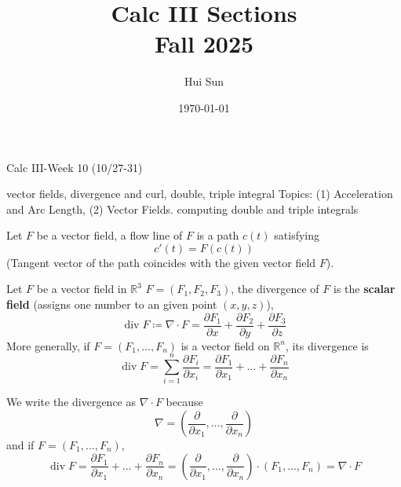 \documentclass[openany]{book}
\title{Calc III Sections
\\ 
\vspace{0.4cm}
\large Fall 2025}
\date{\today}
\author{Hui Sun}
\newcommand{\R}{\mathbb{R}}
\newcommand{\diverg}{\operatorname{div}}
\begin{document}
\maketitle

\newpage


\begin{center}
    \Large Calc III-Week 10 (10/27-31)
\end{center}

\renewcommand\thesection{\arabic{section}}

\noindent


vector fields, divergence and curl, double, triple integral
Topics: (1) Acceleration and Arc Length, (2) Vector Fields.
computing double and triple integrals



\begin{defn}
    Let ${F}$ be a vector field, a flow line of $F$ is a path $c(t)$ satisfying 
    \begin{equation*}
        c'(t)=F(c(t))
    \end{equation*}
    (Tangent vector of the path coincides with the given vector field ${F}$).
\end{defn}

\begin{defn}[divergence]
    Let ${F}$ be a vector field in $\R^3$ $F=(F_1,F_2,F_3)$, the divergence of ${F}$ is the \textbf{scalar field} (assigns one number to an given point $(x, y, z)$), 
    \begin{equation*}
        \diverg F\coloneq\nabla\cdot F=\frac{\partial F_1}{\partial x}+\frac{\partial F_2}{\partial y}+\frac{\partial F_3}{\partial z}
    \end{equation*}
    More generally, if $F=(F_1,\dots, F_n)$ is a vector field on $\R^n$, its divergence is 
    \begin{equation*}
        \diverg F=\sum_{i=1}^n\frac{\partial F_i}{\partial x_i}=\frac{\partial F_1}{\partial x_1}+\dots+\frac{\partial F_n}{\partial x_n}
    \end{equation*}
\end{defn}

\begin{remark}
    We write the divergence as $\nabla\cdot F$ because 
    \begin{equation*}
        \nabla=\left(\frac{\partial}{\partial x_1}, \dots, \frac{\partial}{\partial x_n}\right)
    \end{equation*}
    and if $F=(F_1,\dots, F_n)$, 
    \begin{equation*}
        \diverg F=\frac{\partial F_1}{\partial x_1}+\dots+\frac{\partial F_n}{\partial x_n}=\left(\frac{\partial}{\partial x_1}, \dots, \frac{\partial}{\partial x_n}\right)\cdot(F_1,\dots, F_n)=\nabla\cdot F
    \end{equation*}
\end{remark}
\end{document}
